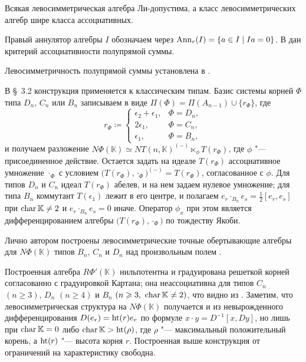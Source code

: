 Всякая левосимметрическая алгебра Ли-допустима, а класс левосимметрических
алгебр шире класса ассоциативных.


Правый аннулятор алгебры $I$ обозначаем через $\operatorname{Ann}_r(I)=\{a\in I\mid Ia=0\}$.
В \cite[теорема~3]{jsfu2026} дан критерий ассоциативности полупрямой суммы.


Левосимметричность полупрямой суммы установлена в \cite[теорема~4]{jsfu2026}.


В \S~3.2 конструкция применяется к классическим типам. Базис системы корней
$\Phi$ типа $D_n$, $C_n$ или $B_n$ записываем в виде
$\Pi(\Phi)=\Pi(A_{n-1})\cup\{r_\Phi\}$, где
\[
    r_\Phi\coloneq
    \begin{cases}
        \epsilon_2 + \epsilon_1, & \Phi = D_n, \\
        2\epsilon_1,             & \Phi = C_n, \\
        \epsilon_1,              & \Phi = B_n,
    \end{cases}
\]
и получаем разложение $N\Phi(\mathbb{K})\simeq NT(n,\mathbb{K})^{(-)}
\ltimes_\phi T(r_\Phi)$, где $\phi$ "--- присоединенное действие. Остается
задать на идеале $T(r_\Phi)$ ассоциативное умножение $\cdot_\Phi$ с условием
$\bigl(T(r_\Phi),\cdot_\Phi\bigr)^{(-)}=T(r_\Phi)$, согласованное с $\phi$. Для
типов $D_n$ и $C_n$ идеал $T(r_\Phi)$ абелев, и на нем задаем нулевое
умножение; для типа $B_n$ коммутант $T(\epsilon_1)$ лежит в его центре, и
полагаем $e_r\cdot_{B_n}e_s=\frac12[e_r,e_s]$ при $\operatorname{char}\mathbb{K}\neq2$ и
$e_r\cdot_{B_n}e_s=0$ иначе. Оператор $\phi_x$ при этом является
дифференцированием алгебры $\bigl(T(r_\Phi),\cdot_\Phi\bigr)$ по тождеству
Якоби.

Лично автором построены левосимметрические точные обертывающие алгебры для
$N\Phi(\mathbb{K})$ типов $B_n$, $C_n$ и $D_n$ над произвольным полем
\cite[теорема~5]{jsfu2026}.


Построенная алгебра $R\Phi'(\mathbb{K})$ нильпотентна и градуирована решеткой
корней согласованно с градуировкой Картана; она неассоциативна для типов $C_n$
$(n\geq3)$, $D_n$ $(n\geq4)$ и $B_n$ $(n\geqslant3,\ \operatorname{char}\mathbb{K}\neq2)$, что
видно из . Заметим, что левосимметрическая
структура на $N\Phi(\mathbb{K})$ получается и из невырожденного
дифференцирования $D(e_r)=\operatorname{ht}(r)e_r$ по формуле $x\cdot y=D^{-1}[x,Dy]$, но
лишь при $\operatorname{char}\mathbb{K}=0$ либо $\operatorname{char}\mathbb{K}>\operatorname{ht}(\rho)$, где $\rho$
"--- максимальный положительный корень, а $\operatorname{ht}(r)$ "--- высота корня $r$.
Построенная выше конструкция от ограничений на характеристику свободна.

